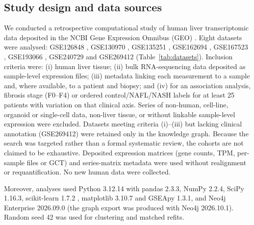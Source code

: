 \documentclass[11pt,a4paper]{article}
\begin{document}
\subsection*{Study design and data sources}
We conducted a retrospective computational study of human liver transcriptomic data deposited in the NCBI Gene Expression Omnibus (GEO) \cite{edgar2002}. Eight datasets were analysed: GSE126848 \cite{suppli2019}, GSE130970 \cite{hoang2019}, GSE135251 \cite{govaere2020}, GSE162694 \cite{pantano2021}, GSE167523 \cite{kozumi2021}, GSE193066 \cite{fujiwara2022}, GSE240729 \cite{verschuren2024} and GSE269412 \cite{steinhauser2025} (Table~\ref{tab:datasets}). Inclusion criteria were: (i) human liver tissue; (ii) bulk RNA-sequencing data deposited as sample-level expression files; (iii) metadata linking each measurement to a sample and, where available, to a patient and biopsy; and (iv) for an association analysis, fibrosis stage (F0--F4) or ordered control/NAFL/NASH labels for at least 25 patients with variation on that clinical axis. Series of non-human, cell-line, organoid or single-cell data, non-liver tissue, or without linkable sample-level expression were excluded. Datasets meeting criteria (i)--(iii) but lacking clinical annotation (GSE269412) were retained only in the knowledge graph. Because the search was targeted rather than a formal systematic review, the cohorts are not claimed to be exhaustive. Deposited expression matrices (gene counts, TPM, per-sample files or GCT) and series-matrix metadata were used without realignment or requantification. No new human data were collected.

Moreover, analyses used Python 3.12.14 with pandas 2.3.3, NumPy 2.2.4, SciPy 1.16.3, scikit-learn 1.7.2 \cite{pedregosa2011}, matplotlib 3.10.7 and GSEApy 1.3.1, and Neo4j Enterprise 2026.09.0 (the graph export was produced with Neo4j 2026.10.1). Random seed 42 was used for clustering and matched refits.
\end{document}
